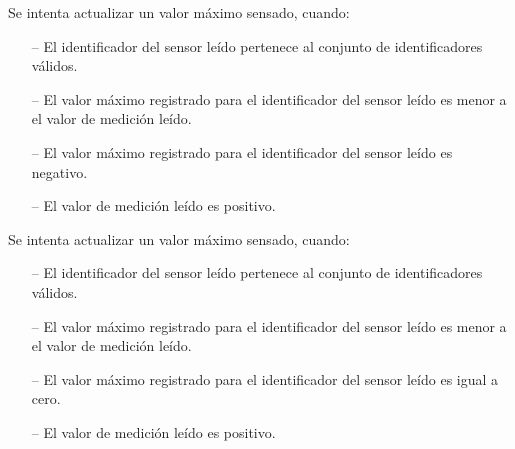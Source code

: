 \begin{tcolorbox}[colback=gray!5!white,colframe=gray!50!black,
  colbacktitle=gray!75!black,title=KeepMaxReading\_SP\_3]
  Se intenta actualizar un valor máximo sensado, cuando:
     \begin{itemize}
  	    \item[--]{El identificador del sensor leído pertenece al conjunto de identificadores válidos.}
  	    \item[--]{El valor máximo registrado para el identificador del sensor leído es menor a el valor de medición leído.}
	      \item[--]{El valor máximo registrado para el identificador del sensor leído es negativo.}
	      \item[--]{El valor de medición leído es positivo.}
     \end{itemize}
\end{tcolorbox}


\begin{tcolorbox}[colback=gray!5!white,colframe=gray!50!black,
  colbacktitle=gray!75!black,title=KeepMaxReading\_SP\_4]
  Se intenta actualizar un valor máximo sensado, cuando:
     \begin{itemize}
        \item[--]{El identificador del sensor leído pertenece al conjunto de identificadores válidos.}
        \item[--]{El valor máximo registrado para el identificador del sensor leído es menor a el valor de medición leído.}
        \item[--]{El valor máximo registrado para el identificador del sensor leído es igual a cero.}
        \item[--]{El valor de medición leído es positivo.}
     \end{itemize}
\end{tcolorbox}



